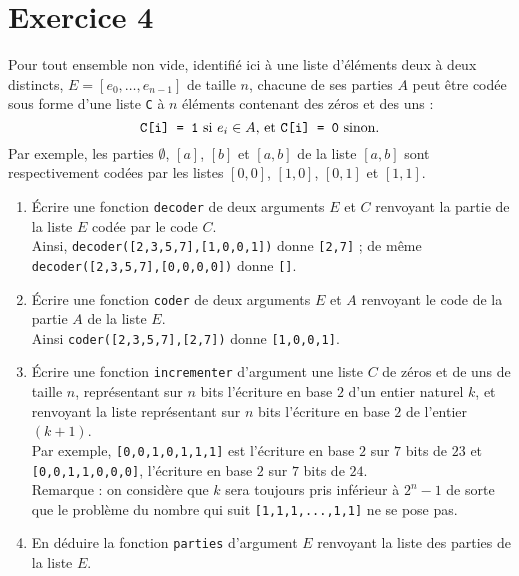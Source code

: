 \section*{Exercice 4}
Pour tout ensemble non vide, identifié ici à une liste d'éléments deux à deux distincts, $E = [e_0,\dots , e_{n-1}]$ de taille $n$, chacune de ses parties $A$ peut être codée sous forme d'une liste \texttt{C} à $n$ éléments contenant des zéros et des uns :\\
$$\text{\texttt{C[i] = 1} si $e_i\in A$, et \texttt{C[i] = 0} sinon.}$$
Par exemple, les parties $\emptyset$, $[a]$, $[b]$ et $[a, b]$ de la liste $[a, b]$ sont respectivement codées par les listes $[0, 0]$, $[1, 0]$, $[0, 1]$ et $[1, 1]$.
\begin{enumerate}
\item Écrire une fonction \texttt{decoder} de deux arguments $E$ et $C$ renvoyant la partie de la liste $E$  codée par le code $C$.\\
Ainsi, \texttt{decoder([2,3,5,7],[1,0,0,1])} donne \texttt{[2,7]} ; de même \texttt{decoder([2,3,5,7],[0,0,0,0])}
donne \texttt{[]}.
\item Écrire une fonction \texttt{coder} de deux arguments $E$ et $A$ renvoyant le code de la partie $A$ de la liste $E$.\\
Ainsi \texttt{coder([2,3,5,7],[2,7])} donne \texttt{[1,0,0,1]}.
\item Écrire une fonction \texttt{incrementer} d'argument une liste $C$ de zéros et de uns de taille $n$, représentant sur $n$ bits l'écriture en base $2$ d'un entier naturel $k$, et renvoyant la liste représentant sur $n$ bits l'écriture en base $2$ de l'entier $(k + 1)$.\\
Par exemple, \texttt{[0,0,1,0,1,1,1]} est l'écriture en base $2$ sur $7$ bits de $23$ et \texttt{[0,0,1,1,0,0,0]}, l'écriture en base $2$ sur $7$ bits de $24$.\\
Remarque : on considère que $k$ sera toujours pris inférieur à $2^n-1$ de sorte que le problème du nombre qui suit \texttt{[1,1,1,...,1,1]} ne se pose pas.
\item En déduire la fonction \texttt{parties} d'argument $E$ renvoyant la liste des parties de la liste $E$.
\end{enumerate}










